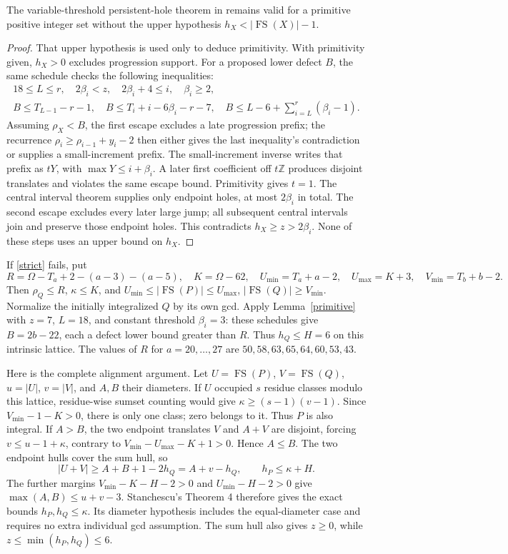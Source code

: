 \documentclass[11pt,a4paper]{article}
\newcommand{\FS}{\operatorname{FS}}\newcommand{\Z}{\mathbb Z}
\begin{document}
\begin{lemma}\label{primitive}
The variable-threshold persistent-hole theorem in \cite{schedule} remains
valid for a primitive positive integer set without the upper hypothesis
$h_X<|\FS(X)|-1$.
\end{lemma}
\begin{proof}
That upper hypothesis is used only to deduce primitivity. With primitivity
given, $h_X>0$ excludes progression support. For a proposed lower defect
$B$, the same schedule checks the following inequalities:
\begin{gather*}
 18\le L\le r,\quad 2\beta_i<z,\quad 2\beta_i+4\le i,\quad\beta_i\ge2,\\
 B\le T_{L-1}-r-1,\quad B\le T_i+i-6\beta_i-r-7,
 \quad B\le L-6+\sum_{i=L}^r(\beta_i-1).
\end{gather*}
Assuming $\rho_X<B$, the first escape excludes a late progression prefix;
the recurrence $\rho_i\ge\rho_{i-1}+y_i-2$ then either gives the last
inequality's contradiction or supplies a small-increment prefix.
The small-increment inverse writes that prefix as $tY$, with
$\max Y\le i+\beta_i$. A later first coefficient off $t\Z$ produces
disjoint translates and violates the same escape bound. Primitivity gives
$t=1$. The central interval theorem supplies only endpoint holes, at most
$2\beta_i$ in total. The second escape excludes every later large jump;
all subsequent central intervals join and preserve those endpoint holes.
This contradicts $h_X\ge z>2\beta_i$. None of these steps uses an upper
bound on $h_X$.
\end{proof}

If \eqref{strict} fails, put
\[
 R=\Omega-T_a+2-(a-3)-(a-5),\quad K=\Omega-62,
 \quad U_{\min}=T_a+a-2,\quad U_{\max}=K+3,\quad V_{\min}=T_b+b-2.
\]
Then $\rho_Q\le R$, $\kappa\le K$, and
$U_{\min}\le|\FS(P)|\le U_{\max}$, $|\FS(Q)|\ge V_{\min}$.
Normalize the initially integralized $Q$ by its own gcd. Apply
Lemma~\ref{primitive} with $z=7$, $L=18$, and constant threshold $\beta_i=3$:
these schedules give $B=2b-22$, each a defect lower
bound greater than $R$. Thus $h_Q\le H=6$ on this intrinsic lattice.
The values of $R$ for $a=20,\ldots,27$ are
$50,58,63,65,64,60,53,43$.

Here is the complete alignment argument. Let $U=\FS(P)$, $V=\FS(Q)$,
$u=|U|$, $v=|V|$, and $A,B$ their diameters. If $U$ occupied $s$ residue
classes modulo this lattice, residue-wise sumset counting would give
$\kappa\ge(s-1)(v-1)$. Since $V_{\min}-1-K>0$, there is only one
class; zero belongs to it. Thus $P$ is also integral. If $A>B$, the two
endpoint translates $V$ and $A+V$ are disjoint, forcing
$v\le u-1+\kappa$, contrary to $V_{\min}-U_{\max}-K+1>0$.
Hence $A\le B$. The two endpoint hulls cover the sum hull, so
\[
 |U+V|\ge A+B+1-2h_Q=A+v-h_Q,
 \qquad h_P\le\kappa+H.
\]
The further margins $V_{\min}-K-H-2>0$ and $U_{\min}-H-2>0$
give $\max(A,B)\le u+v-3$. Stanchescu's Theorem 4
\cite{stanchescu} therefore gives the exact bounds
$h_P,h_Q\le\kappa$. Its diameter hypothesis includes the equal-diameter
case and requires no extra individual gcd assumption.
The sum hull also gives $z\ge0$, while $z\le\min(h_P,h_Q)\le6$.
\end{document}
